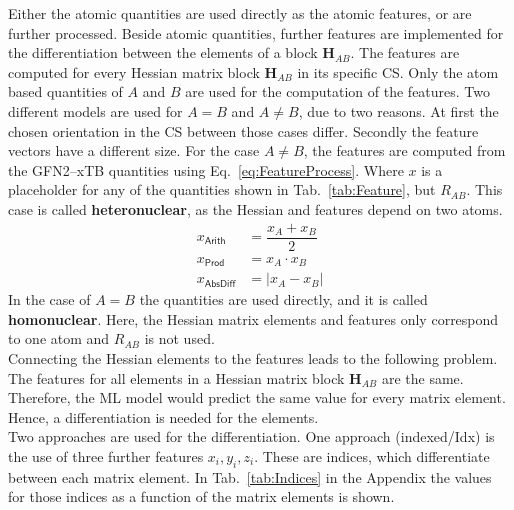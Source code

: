 Either the atomic quantities are used directly as the atomic features, or are further processed.
Beside atomic quantities, further features are implemented for the differentiation between the elements of a block $\textbf{H}_{AB}$.
The features are computed for every Hessian matrix block $\textbf{H}_{AB}$ in its specific CS.
Only the atom based quantities of $A$ and $B$ are used for the computation of the features.
\newpage
Two different models are used for $A = B$ and $A \neq B$, due to two reasons.
At first the chosen orientation in the CS between those cases differ.
Secondly the feature vectors have a different size.
For the case $A \neq B$, the features are computed from the GFN2--xTB quantities using Eq.~\eqref{eq:FeatureProcess}.
Where $x$ is a placeholder for any of the quantities shown in Tab.~\ref{tab:Feature}, but $R_{AB}$.
This case is called \textbf{heteronuclear}, as the Hessian and features depend on two atoms.
\begin{subequations}
	\label{eq:FeatureProcess}
	\begin{align}
		x_\mathsf{Arith}&= \dfrac{x_A + x_B}{2}\\
		x_\mathsf{Prod}&= x_A \cdot x_B \\
		x_\mathsf{AbsDiff}&= | x_A - x_B | 
	\end{align}
\end{subequations}
In the case of $A = B$ the quantities are used directly, and it is called \textbf{homonuclear}.
Here, the Hessian matrix elements and features only correspond to one atom and $R_{AB}$ is not used.\\
Connecting the Hessian elements to the features leads to the following problem.
The features for all elements in a Hessian matrix block $\textbf{H}_{AB}$ are the same.
Therefore, the ML model would predict the same value for every matrix element.
Hence, a differentiation is needed for the elements.\\
Two approaches are used for the differentiation.
One approach (indexed/Idx) is the use of three further features $x_i, y_i, z_i$.
These are indices, which differentiate between each matrix element.
In Tab.~\ref{tab:Indices} in the Appendix the values for those indices as a function of the matrix elements is shown.\\
\newpage


